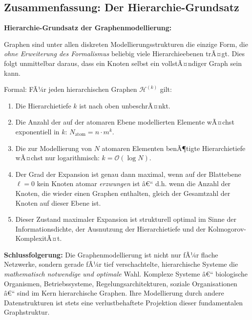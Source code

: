 ﻿\documentclass[12pt,a4paper,twoside]{article}
\theoremstyle{definition}
\theoremstyle{plain}
\theoremstyle{remark}
\begin{document}
\subsection{Zusammenfassung: Der Hierarchie-Grundsatz}
\label{sub:zusammenfassung_hierarchie}

	\textbf{Hierarchie-Grundsatz der Graphenmodellierung:}
	
	\medskip
	\noindent
	Graphen sind unter allen diskreten Modellierungsstrukturen die
	einzige Form, die \emph{ohne Erweiterung des Formalismus}
	beliebig viele Hierarchieebenen trÃ¤gt.  Dies folgt unmittelbar
	daraus, dass ein Knoten selbst ein vollstÃ¤ndiger Graph sein kann.
	
	\medskip
	\noindent
	Formal: FÃ¼r jeden hierarchischen Graphen $\mathcal{H}^{(k)}$
	gilt:
	\begin{enumerate}
		\item Die Hierarchietiefe $k$ ist nach oben unbeschrÃ¤nkt.
		\item Die Anzahl der auf der atomaren Ebene modellierten
		Elemente wÃ¤chst exponentiell in $k$:
		$N_{\text{atom}} = n \cdot m^k$.
		\item Die zur Modellierung von $N$ atomaren Elementen benÃ¶tigte
		Hierarchietiefe wÃ¤chst nur logarithmisch:
		$k = \mathcal{O}(\log N)$.
		\item Der Grad der Expansion ist genau dann maximal, wenn
		auf der Blattebene $\ell = 0$ kein Knoten atomar
		\emph{erzwungen} ist â€“ d.h. wenn die Anzahl der Knoten,
		die wieder einen Graphen enthalten, gleich der
		Gesamtzahl der Knoten auf dieser Ebene ist.
		\item Dieser Zustand maximaler Expansion ist strukturell
		optimal im Sinne der Informationsdichte, der
		Ausnutzung der Hierarchietiefe und der
		Kolmogorov-KomplexitÃ¤t.
	\end{enumerate}
	
	\medskip
	\noindent
	\textbf{Schlussfolgerung:} Die Graphenmodellierung ist nicht
	nur fÃ¼r flache Netzwerke, sondern gerade fÃ¼r tief verschachtelte,
	hierarchische Systeme die \emph{mathematisch notwendige und optimale}
	Wahl.  Komplexe Systeme â€“ biologische Organismen, Betriebssysteme,
	Regelungsarchitekturen, soziale Organisationen â€“ sind im Kern
	hierarchische Graphen.  Ihre Modellierung durch andere
	Datenstrukturen ist stets eine verlustbehaftete Projektion
	dieser fundamentalen Graphstruktur.
\end{document}
